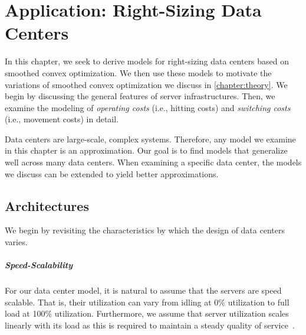 
\chapter{Application: Right-Sizing Data Centers}\label{chapter:application}

In this chapter, we seek to derive models for right-sizing data centers based on smoothed convex optimization. We then use these models to motivate the variations of smoothed convex optimization we discuss in \cref{chapter:theory}. We begin by discussing the general features of server infrastructures. Then, we examine the modeling of \emph{operating costs} (i.e., hitting costs) and \emph{switching costs} (i.e., movement costs) in detail.

Data centers are large-scale, complex systems. Therefore, any model we examine in this chapter is an approximation. Our goal is to find models that generalize well across many data centers. When examining a specific data center, the models we discuss can be extended to yield better approximations.

\section{Architectures}\label{section:application:architectures}

We begin by revisiting the characteristics by which the design of data centers varies.

\paragraph{Speed-Scalability} For our data center model, it is natural to assume that the servers are speed scalable. That is, their utilization can vary from idling at 0\% utilization to full load at 100\% utilization. Furthermore, we assume that server utilization scales linearly with its load as this is required to maintain a steady quality of service~\cite{Bansal2015}.


